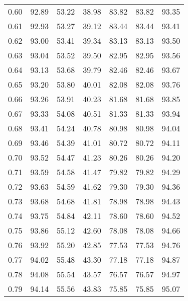 \begin{tabular}{|c|c|c|c|c|c|c|}
      0.60 &     92.89 &     53.22 &      38.98 &   83.82 &      83.82 &         93.35 \\
      0.61 &     92.93 &     53.27 &      39.12 &   83.44 &      83.44 &         93.41 \\
      0.62 &     93.00 &     53.41 &      39.34 &   83.13 &      83.13 &         93.50 \\
      0.63 &     93.04 &     53.52 &      39.50 &   82.95 &      82.95 &         93.56 \\
      0.64 &     93.13 &     53.68 &      39.79 &   82.46 &      82.46 &         93.67 \\
      0.65 &     93.20 &     53.80 &      40.01 &   82.08 &      82.08 &         93.76 \\
      0.66 &     93.26 &     53.91 &      40.23 &   81.68 &      81.68 &         93.85 \\
      0.67 &     93.33 &     54.08 &      40.51 &   81.33 &      81.33 &         93.94 \\
      0.68 &     93.41 &     54.24 &      40.78 &   80.98 &      80.98 &         94.04 \\
      0.69 &     93.46 &     54.39 &      41.01 &   80.72 &      80.72 &         94.11 \\
      0.70 &     93.52 &     54.47 &      41.23 &   80.26 &      80.26 &         94.20 \\
      0.71 &     93.59 &     54.58 &      41.47 &   79.82 &      79.82 &         94.29 \\
      0.72 &     93.63 &     54.59 &      41.62 &   79.30 &      79.30 &         94.36 \\
      0.73 &     93.68 &     54.68 &      41.81 &   78.98 &      78.98 &         94.43 \\
      0.74 &     93.75 &     54.84 &      42.11 &   78.60 &      78.60 &         94.52 \\
      0.75 &     93.86 &     55.12 &      42.60 &   78.08 &      78.08 &         94.66 \\
      0.76 &     93.92 &     55.20 &      42.85 &   77.53 &      77.53 &         94.76 \\
      0.77 &     94.02 &     55.48 &      43.30 &   77.18 &      77.18 &         94.87 \\
      0.78 &     94.08 &     55.54 &      43.57 &   76.57 &      76.57 &         94.97 \\
      0.79 &     94.14 &     55.56 &      43.83 &   75.85 &      75.85 &         95.07 \\

\end{tabular}

